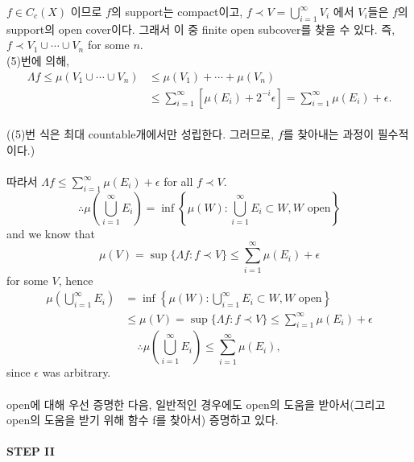 \documentclass[11pt,reqno]{amsart}
\renewcommand{\(}{\left(}
\renewcommand{\)}{\right)}
\renewcommand{\[}{\left[}
\renewcommand{\]}{\right]}
\newcommand{\ep}{\epsilon}
\begin{document}
$f \in C_c(X)$ 이므로 $f$의 support는 compact이고, $\displaystyle f \prec V = \bigcup _{i=1} ^\infty V_i$ 에서 $V_i$들은 $f$의 support의
open cover이다. 그래서 이 중 finite open subcover를 찾을 수 있다. 즉, $f \prec V_1 \cup \cdots \cup V_n$ 
for some $n$. \\
(5)번에 의해, \begin{align*}
  \Lambda f \le \mu(V_1 \cup \cdots \cup V_n) &\le \mu(V_1) + \cdots + \mu(V_n) \\
  &\le \sum_{i=1}^\infty \[ \mu(E_i) + 2^{-i}\ep \] = \sum_{i=1}^\infty \mu(E_i) + \ep.
\end{align*} \\
((5)번 식은 최대 countable개에서만 성립한다. 그러므로, $f$를 찾아내는 과정이 필수적이다.) \\ \\

따라서 $\displaystyle \Lambda f \le \sum_{i=1}^\infty \mu(E_i) + \ep$ for all $f \prec V$. \\
\begin{equation*}
  \therefore \mu \( \bigcup_{i=1}^\infty E_i \) = \inf \left\{ \mu(W) : \bigcup_{i=1}^\infty E_i \subset W, W \text{ open} \right\}
\end{equation*}
and we know that \begin{equation*}
  \mu (V) = \sup \{ \Lambda f : f \prec V \} \le \sum_{i=1}^\infty \mu(E_i) + \ep
\end{equation*}
for some $V$, hence \begin{align*}
  \mu \( \bigcup_{i=1}^\infty E_i \) & = \inf \left\{ \mu(W) : \bigcup_{i=1}^\infty E_i \subset W, W \text{ open} \right\} \\
  & \le \mu (V) = \sup \{ \Lambda f : f \prec V \} \le \sum_{i=1}^\infty \mu(E_i) + \ep
\end{align*}
\begin{equation*}
  \therefore \mu \( \bigcup_{i=1}^\infty E_i \) \le \sum_{i=1}^\infty \mu(E_i),
\end{equation*}
since $\ep$ was arbitrary. \\ \\

open에 대해 우선 증명한 다음, 일반적인 경우에도 open의 도움을 받아서(그리고 open의 도움을 받기 위해 함수 f를 찾아서) 증명하고 있다.

\paragraph{STEP II}
\end{document}
